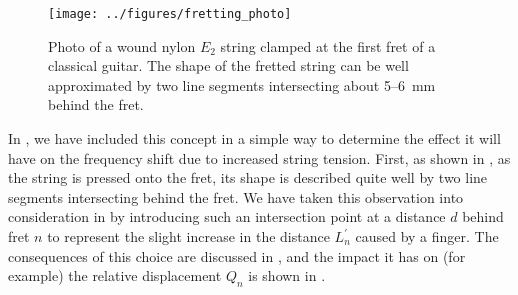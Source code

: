 \begin{figure}
    \centering
    \texttt{[image: ../figures/fretting\_photo]}
    \caption{\label{fig:fretting_photo} Photo of a wound nylon $E_2$ string clamped at the first fret of a classical guitar. The shape of the fretted string can be well approximated by two line segments intersecting about 5--6~mm behind the fret.}
\end{figure}


In , we have included this concept in a simple way to determine the effect it will have on the frequency shift due to increased string tension. First, as shown in , as the string is pressed onto the fret, its shape is described quite well by two line segments intersecting behind the fret. We have taken this observation into consideration in  by introducing such an intersection point at a distance $d$ behind fret $n$ to represent the slight increase in the distance $L_n^\prime$ caused by a finger. The consequences of this choice are discussed in , and the impact it has on (for example) the relative displacement $Q_n$ is shown in .


